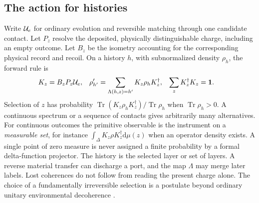 \documentclass[11pt,a4paper]{article}
\newcommand{\Tr}{\operatorname{Tr}}
\newcommand{\id}{\mathbf 1}
\newcommand{\dd}{\mathrm d}
\begin{document}
\subsection{The action for histories}
Write \({\cal U}_e\) for ordinary evolution and reversible matching through one candidate contact. Let \(P_z\) resolve the deposited, physically distinguishable charge, including an empty outcome. Let \(B_z\) be the isometry accounting for the corresponding physical record and recoil. On a history \(h\), with subnormalized density \(\rho_h\), the forward rule is
\begin{align}
 K_z&=B_zP_z{\cal U}_e,&
 \rho'_{h'}&=\sum_{\Lambda(h,z)=h'}K_z\rho_hK_z^\dagger,&
 \sum_z K_z^\dagger K_z&=\id .
 \label{eq:write}
\end{align}
Selection of \(z\) has probability \(\Tr(K_z\rho_hK_z^\dagger)/\Tr\rho_h\) when \(\Tr\rho_h>0\). A continuous spectrum or a sequence of contacts gives arbitrarily many alternatives. For continuous outcomes the primitive observable is the instrument on a \emph{measurable set}, for instance \(\int_\Delta K_z\rho K_z^\dagger\dd\mu(z)\) when an operator density exists. A single point of zero measure is never assigned a finite probability by a formal delta-function projector. The history is the selected layer or set of layers. A reverse material transfer can discharge a port, and the map \(\Lambda\) may merge later labels. Lost coherences do not follow from reading the present charge alone. The choice of a fundamentally irreversible selection is a postulate beyond ordinary unitary environmental decoherence \cite{luders,relational,tilloy}.
\end{document}
